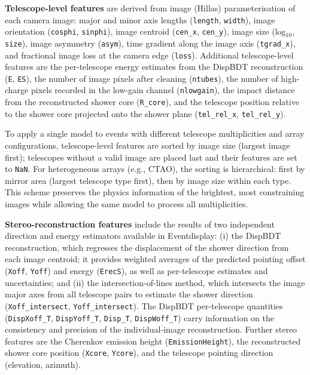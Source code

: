 \documentclass[12pt]{article}
\begin{document}
\textbf{Telescope-level features} are derived from image (Hillas) parameterisation
of each camera image: major and minor axis lengths (\texttt{length}, \texttt{width}),
image orientation (\texttt{cosphi}, \texttt{sinphi}), image centroid
(\texttt{cen\_x}, \texttt{cen\_y}), image size (log$_{10}$, \texttt{size}),
image asymmetry (\texttt{asym}), time gradient along the image axis (\texttt{tgrad\_x}),
and fractional image loss at the camera edge (\texttt{loss}).
Additional telescope-level features are
the per-telescope energy estimates from the DispBDT reconstruction
(\texttt{E}, \texttt{ES}), the number of image pixels after cleaning (\texttt{ntubes}),
the number of high-charge pixels recorded in the low-gain channel (\texttt{nlowgain}),
the impact distance from the reconstructed shower core (\texttt{R\_core}),
and the telescope position relative to the shower core projected onto the shower plane
(\texttt{tel\_rel\_x}, \texttt{tel\_rel\_y}).

To apply a single model to events with different telescope multiplicities and
array configurations, telescope-level features are sorted by image size
(largest image first); telescopes without a valid image are placed last and
their features are set to \texttt{NaN}.
For heterogeneous arrays (e.g., CTAO), the sorting is hierarchical: first by
mirror area (largest telescope type first), then by image size within each type.
This scheme preserves the physics information of the brightest, most constraining
images while allowing the same model to process all multiplicities.

\textbf{Stereo-reconstruction features} include the results of two independent
direction and energy estimators available in Eventdisplay:
(i) the DispBDT reconstruction, which regresses the displacement of the shower
direction from each image centroid; it provides weighted averages of the
predicted pointing offset (\texttt{Xoff}, \texttt{Yoff}) and energy
(\texttt{ErecS}), as well as per-telescope estimates and uncertainties;
and (ii) the intersection-of-lines method, which intersects the image major axes
from all telescope pairs to estimate the shower direction (\texttt{Xoff\_intersect},
\texttt{Yoff\_intersect}).
The DispBDT per-telescope quantities (\texttt{DispXoff\_T}, \texttt{DispYoff\_T},
\texttt{Disp\_T}, \texttt{DispWoff\_T}) carry information on the consistency
and precision of the individual-image reconstruction.
Further stereo features are the Cherenkov emission height (\texttt{EmissionHeight}),
the reconstructed shower core position (\texttt{Xcore}, \texttt{Ycore}),
and the telescope pointing direction (elevation, azimuth).
\end{document}
